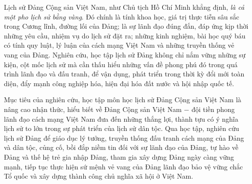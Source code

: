 Lịch sử Đảng Cộng sản Việt Nam, như Chủ tịch Hồ Chí Minh khẳng định, \textit{là cả một pho lịch sử bằng vàng}. Đó chính là tính khoa học, giá trị thực tiễn sâu sắc trong Cương lĩnh, đường lối của Đảng; là sự lãnh đạo đúng đắn, đáp ứng kịp thời những yêu cầu, nhiệm vụ do lịch sử đặt ra; những kinh nghiệm, bài học quý báu có tính quy luật, lý luận của cách mạng Việt Nam và những truyền thống vẻ vang của Đảng. Nghiên cứu, học tập lịch sử Đảng không chỉ nắm vững những sự kiện, cột mốc lịch sử mà cần thấu hiểu những vấn đề phong phú đó trong quá trình lãnh đạo và đấu tranh, để vận dụng, phát triển trong thời kỳ đổi mới toàn diện, đẩy mạnh công nghiệp hóa, hiện đại hóa đất nước và hội nhập quốc tế.

Mục tiêu của nghiên cứu, học tập môn học lịch sử Đảng Cộng sản Việt Nam là nâng cao nhận thức, hiểu biết về Đảng Cộng sản Việt Nam $-$ đội tiền phong lãnh đạo cách mạng Việt Nam đưa đến những thắng lợi, thành tựu có ý nghĩa lịch sử to lớn trong sự phát triển của lịch sử dân tộc. Qua học tập, nghiên cứu lịch sử Đảng để giáo dục lý tưởng, truyền thống đấu tranh cách mạng của Đảng và dân tộc, củng cố, bồi đắp niềm tin đối với sự lãnh đạo của Đảng, tự hào về Đảng và thế hệ trẻ gia nhập Đảng, tham gia xây dựng Đảng ngày càng vững mạnh, tiếp tục thực hiện sứ mệnh vẻ vang của Đảng lãnh đạo bảo vệ vững chắc Tổ quốc và xây dựng thành công chủ nghĩa xã hội ở Việt Nam.